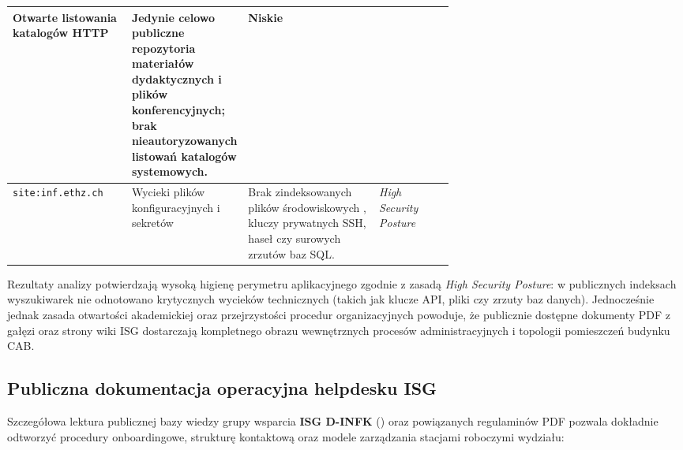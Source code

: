 {{\begin{table}[htbp]
\begin{tabularx}{\linewidth}{L{0.27\linewidth} L{0.21\linewidth} Y L{0.17\linewidth}}
        Otwarte listowania katalogów HTTP &
        Jedynie celowo publiczne repozytoria materiałów dydaktycznych i plików konferencyjnych; brak nieautoryzowanych listowań katalogów systemowych. &
        Niskie \\
        \midrule
        \nolinkurl{site:inf.ethz.ch}  &
        Wycieki plików konfiguracyjnych i sekretów &
        Brak zindeksowanych plików środowiskowych , kluczy prywatnych SSH, haseł czy surowych zrzutów baz SQL. &
        \textit{High Security Posture} \\
        \bottomrule
    \end{tabularx}
\end{table}

Rezultaty analizy potwierdzają wysoką higienę perymetru aplikacyjnego zgodnie z zasadą \textit{High Security Posture}: w publicznych indeksach wyszukiwarek nie odnotowano krytycznych wycieków technicznych (takich jak klucze API, pliki  czy zrzuty baz danych). Jednocześnie jednak zasada otwartości akademickiej oraz przejrzystości procedur organizacyjnych powoduje, że publicznie dostępne dokumenty PDF z gałęzi  oraz strony wiki ISG dostarczają kompletnego obrazu wewnętrznych procesów administracyjnych i topologii pomieszczeń budynku CAB.

\subsection{Publiczna dokumentacja operacyjna helpdesku ISG}\label{subsec:dorking-isg}

Szczegółowa lektura publicznej bazy wiedzy grupy wsparcia \textbf{ISG D-INFK} () \cite{isg_dinfk_wiki} oraz powiązanych regulaminów PDF pozwala dokładnie odtworzyć procedury onboardingowe, strukturę kontaktową oraz modele zarządzania stacjami roboczymi wydziału:

}}
